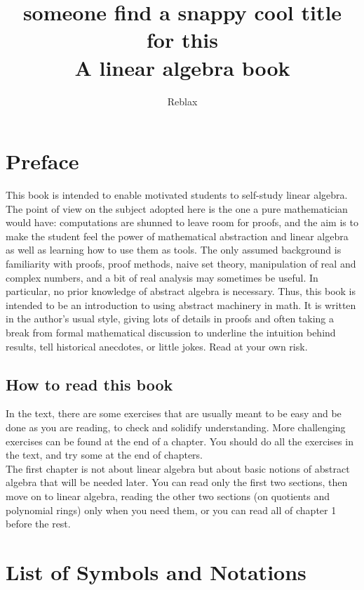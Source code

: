 \documentclass{book}
\title{someone find a snappy cool title for this \\ \small A linear algebra book}
\author{Reblax}
\date{}
\theoremstyle{plain}
\theoremstyle{definition}
\theoremstyle{remark}
\begin{document}
\maketitle

\tableofcontents

\chapter*{Preface}
This book is intended to enable motivated students to self-study linear algebra. The point of view on the subject adopted here is the one a pure mathematician would have: computations are shunned to leave room for proofs, and the aim is to make the student feel the power of mathematical abstraction and linear algebra as well as learning how to use them as tools. The only assumed background is familiarity with proofs, proof methods, naive set theory, manipulation of real and complex numbers, and a bit of real analysis may sometimes be useful. In particular, no prior knowledge of abstract algebra is necessary. Thus, this book is intended to be an introduction to using abstract machinery in math. It is written in the author's usual style, giving lots of details in proofs and often taking a break from formal mathematical discussion to underline the intuition behind results, tell historical anecdotes, or little jokes. Read at your own risk.

\section*{How to read this book}

In the text, there are some exercises that are usually meant to be easy and be done as you are reading, to check and solidify understanding. More challenging exercises can be found at the end of a chapter. You should do all the exercises in the text, and try some at the end of chapters. \\
The first chapter is not about linear algebra but about basic notions of abstract algebra that will be needed later. You can read only the first two sections, then move on to linear algebra, reading the other two sections (on quotients and polynomial rings) only when you need them, or you can read all of chapter 1 before the rest.

\chapter*{List of Symbols and Notations}
\end{document}
